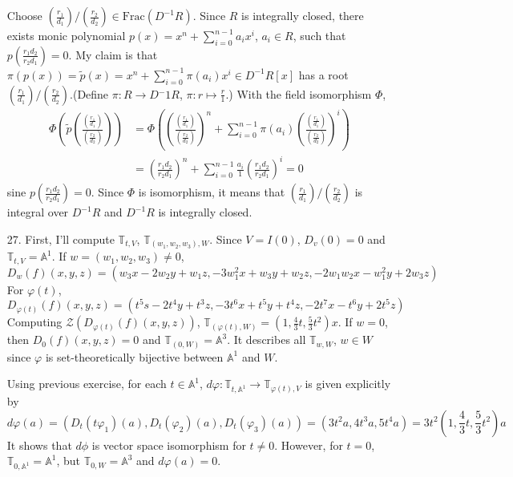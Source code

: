 \documentclass[12pt]{article}
\newcommand{\Z}{\mathcal{Z}}
\begin{document}
\begin{enumerate}
Choose $\left(\frac{r_1}{d_1}\right)/\left(\frac{r_2}{d_2}\right)\in \text{Frac}(D^{-1}R)$. Since $R$ is integrally closed, there exists monic polynomial $p(x)=x^n+\sum\limits_{i=0}^{n-1}a_i x^i$, $a_i\in R$, such that $p\left(\frac{r_1d_2}{r_2d_1}\right)=0$. My claim is that $\pi(p(x))=\tilde{p}(x)=x^n+\sum\limits_{i=0}^{n-1}\pi(a_i) x^i\in D^{-1}R[x]$ has a root $\left(\frac{r_1}{d_1}\right)/\left(\frac{r_2}{d_2}\right)$.(Define $\pi:R\rightarrow D{^-1}R$, $\pi:r\mapsto \frac{r}{1}$.) With the field isomorphism $\Phi$,
\begin{equation*}
\begin{split}
\Phi\left(\tilde{p}\left(\frac{\left(\frac{r_1}{d_1}\right)}{\left(\frac{r_2}{d_2}\right)}\right)\right)&=\Phi\left(\left(\frac{\left(\frac{r_1}{d_1}\right)}{\left(\frac{r_2}{d_2}\right)}\right)^n+\sum\limits_{i=0}^{n-1} \pi(a_i)\left(\frac{\left(\frac{r_1}{d_1}\right)}{\left(\frac{r_2}{d_2}\right)}\right)^{i}\right) \\
&=\left(\frac{r_1d_2}{r_2d_1}\right)^n+\sum\limits_{i=0}^{n-1}\frac{a_i}{1}\left(\frac{r_1d_2}{r_2d_1}\right)^i=0
\end{split}
\end{equation*}
sine $p\left(\frac{r_1d_2}{r_2d_1}\right)=0$. Since $\Phi$ is isomorphism, it means that $\left(\frac{r_1}{d_1}\right)/\left(\frac{r_2}{d_2}\right)$ is integral over $D^{-1}R$ and $D^{-1}R$ is integrally closed.
\newpage
\item[27.]
First, I'll compute $\mathbb{T}_{t, V}$, $\mathbb{T}_{(w_1, w_2, w_3), W}$. Since $V=I(0)$, $D_v(0)=0$ and $\mathbb{T}_{t, V}=\mathbb{A}^1$. If $w=(w_1, w_2, w_3)\neq 0$,
\begin{equation*}
D_w(f)(x,y,z)=(w_3 x-2w_2 y+w_1 z,-3w_1^2 x+w_3 y+w_2 z, -2w_1 w_2 x-w_1^2 y+2w_3 z)
\end{equation*}
For $\varphi(t)$,
\begin{equation*}
D_{\varphi(t)}(f)(x,y,z)=(t^5s-2t^4y+t^3z, -3t^6x+t^5y+t^4z, -2t^7x-t^6y+2t^5z)
\end{equation*}
Computing $\Z\left(D_{\varphi(t)}(f)(x,y,z)\right)$, $\mathbb{T}_{(\varphi(t), W)}= \left(1, \frac{4}{3}t, \frac{5}{3}t^2\right)x$.
If $w=0$, then $D_0(f)(x,y,z)=0$ and $\mathbb{T}_{(0, W)}=\mathbb{A}^3$. It describes all $\mathbb{T}_{w, W}$, $w\in W$ since $\varphi$ is set-theoretically bijective between $\mathbb{A}^1$ and $W$.

Using previous exercise, for each $t\in \mathbb{A}^1$, $d\varphi:\mathbb{T}_{t, \mathbb{A}^1}\rightarrow \mathbb{T}_{\varphi(t),V}$ is given explicitly by
\begin{equation*}
d\varphi(a)=(D_t(t\varphi_1)(a), D_t(\varphi_2)(a), D_t(\varphi_3)(a))=(3t^2a, 4t^3a, 5t^4a)=3t^2\left(1, \frac{4}{3}t, \frac{5}{3}t^2\right)a
\end{equation*}
It shows that $d\phi$ is vector space isomorphism for $t\neq 0$. However, for $t=0$, $\mathbb{T}_{0, \mathbb{A}^1}=\mathbb{A}^1$, but $\mathbb{T}_{0, W}=\mathbb{A}^3$ and $d\varphi(a)=0$.


\end{enumerate}
\end{document}
